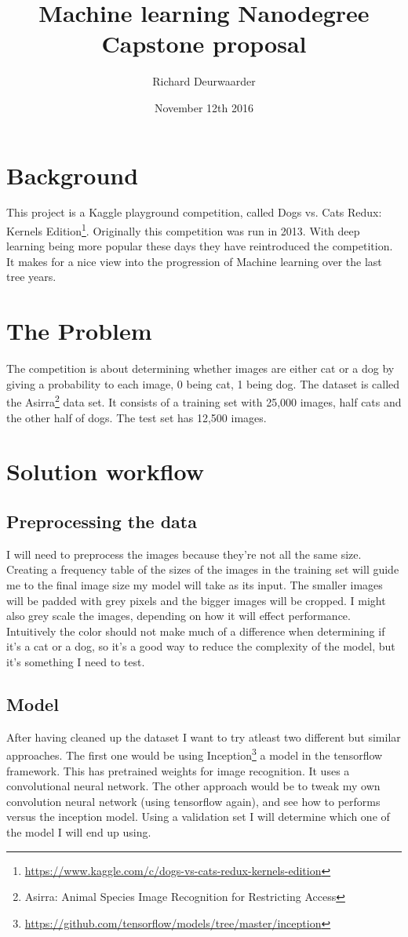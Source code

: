 \documentclass[11pt]{article}
\title{\textbf{Machine learning Nanodegree\\ Capstone proposal}}
\author{Richard Deurwaarder}
\date{November 12th 2016}
\begin{document}
\maketitle

\section{Background}
This project is a Kaggle playground competition, called Dogs vs. Cats Redux: Kernels Edition\footnote{\url{https://www.kaggle.com/c/dogs-vs-cats-redux-kernels-edition}}. Originally this competition was run in 2013. With deep learning being more popular these days they have reintroduced the competition. It makes for a nice view into the  progression of Machine learning over the last tree years.
\section{The Problem}
The competition is about determining whether images are either cat or a dog by giving a probability to each image, 0 being cat, 1 being dog. The dataset is called the Asirra\footnote{Asirra: Animal Species Image Recognition for Restricting Access} data set. It consists of a training set with 25,000 images, half cats and the other half of dogs. The test set has 12,500 images.
\section{Solution workflow}
\subsection{Preprocessing the data}
I will need to preprocess the images because they're not all the same size. Creating a frequency table of the sizes of the images in the training set will guide me to the final image size my model will take as its input. The smaller images will be padded with grey pixels and the bigger images will be cropped. I might also grey scale the images, depending on how it will effect performance. Intuitively the color should not make much of a difference when determining if it's a cat or a dog, so it's a good way to reduce the complexity of the model, but it's something I need to test.

\subsection{Model}
After having cleaned up the dataset I want to try atleast two different but similar approaches. The first one would be using Inception\footnote{\url{https://github.com/tensorflow/models/tree/master/inception}} a model in the tensorflow framework. This has pretrained weights for image recognition. It uses a convolutional neural network.
The other approach would be to tweak my own convolution neural network (using tensorflow again), and see how to performs versus the inception model. Using a validation set I will determine which one of the model I will end up using.
\end{document}
